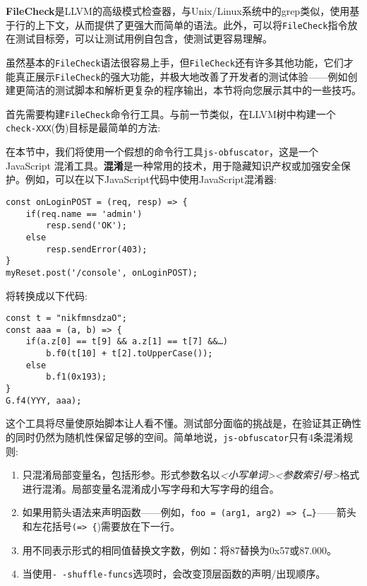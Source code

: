 
\textbf{FileCheck}是LLVM的高级模式检查器，与Unix/Linux系统中的grep类似，使用基于行的上下文，从而提供了更强大而简单的语法。此外，可以将\texttt{FileCheck}指令放在测试目标旁，可以让测试用例自包含，使测试更容易理解。

虽然基本的\texttt{FileCheck}语法很容易上手，但\texttt{FileCheck}还有许多其他功能，它们才能真正展示\texttt{FileCheck}的强大功能，并极大地改善了开发者的测试体验——例如创建更简洁的测试脚本和解析更复杂的程序输出，本节将向您展示其中的一些技巧。


首先需要构建\texttt{FileCheck}命令行工具。与前一节类似，在LLVM树中构建一个\texttt{check-XXX}(伪)目标是最简单的方法:


在本节中，我们将使用一个假想的命令行工具\texttt{js-obfuscator}，这是一个JavaScript 混淆工具。\textbf{混淆}是一种常用的技术，用于隐藏知识产权或加强安全保护。例如，可以在以下JavaScript代码中使用JavaScript混淆器:

\begin{lstlisting}[style=styleJavaScript]
const onLoginPOST = (req, resp) => {
	if(req.name == 'admin')
		resp.send('OK');
	else
		resp.sendError(403);
}
myReset.post('/console', onLoginPOST);
\end{lstlisting}

将转换成以下代码:

\begin{lstlisting}[style=styleJavaScript]
const t = "nikfmnsdzaO";
const aaa = (a, b) => {
	if(a.z[0] == t[9] && a.z[1] == t[7] &&…)
		b.f0(t[10] + t[2].toUpperCase());
	else
		b.f1(0x193);
}
G.f4(YYY, aaa);
\end{lstlisting}

这个工具将尽量使原始脚本让人看不懂。测试部分面临的挑战是，在验证其正确性的同时仍然为随机性保留足够的空间。简单地说，\texttt{js-obfuscator}只有4条混淆规则:

\begin{enumerate}
\item 只混淆局部变量名，包括形参。形式参数名以\textit{<小写单词><参数索引号>}格式进行混淆。局部变量名混淆成小写字母和大写字母的组合。

\item 如果用箭头语法来声明函数——例如，\texttt{foo = (arg1, arg2) => \{…\}}——箭头和左花括号\texttt{(=> \{})需要放在下一行。
	
\item 用不同表示形式的相同值替换文字数，例如：将87替换为0x57或87.000。

\item 当使用\texttt{-\,-shuffle-funcs}选项时，会改变顶层函数的声明/出现顺序。

\end{enumerate}

